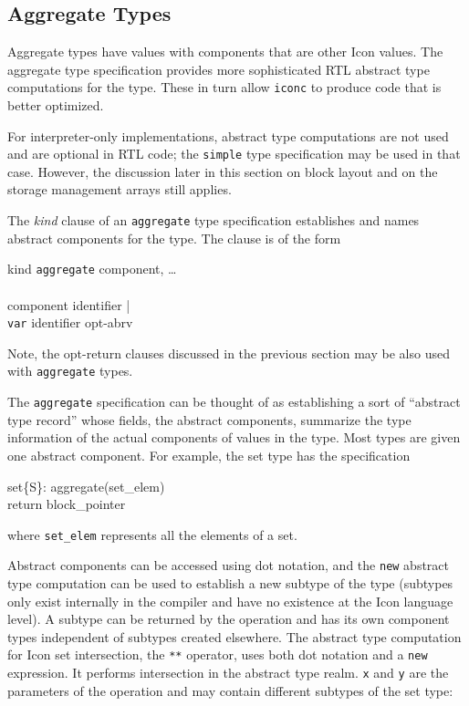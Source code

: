 \subsection{Aggregate Types}

Aggregate types have values with components that are other Icon values.
The aggregate type specification provides more sophisticated RTL abstract
type computations for the type. These in turn allow \texttt{iconc} to
produce code that is better optimized.

For interpreter-only implementations, abstract type computations are not
used and are optional in RTL code; the \texttt{simple} type specification
may be used in that case. However, the discussion later in this section on
block layout and on the storage management arrays still applies.


The \textit{kind} clause of an \texttt{aggregate} type specification
establishes and names abstract components for the type. The clause is of
the form

\begin{ebnf}
kind \cceq \texttt{aggregate} \toklbra component, \ldots \tokrbra\\
\\
component \cceq identifier |\\
\>\>\>\>\>       \texttt{var} identifier opt-abrv
\end{ebnf}

\noindent
Note, the opt-return clauses discussed in the previous section may be
also used with \texttt{aggregate} types.

The \texttt{aggregate} specification can be thought of as establishing a
sort of ``abstract type record'' whose fields, the abstract components,
summarize the type information of the actual components of values in the
type. Most types are given one abstract component. For example, the set
type has the specification
\begin{iconcode}
set\{S\}: \>\>\> aggregate(set\_elem)\\
\>\>\>           return block\_pointer
\end{iconcode}
\noindent
where \texttt{set\_elem} represents all the elements of a set.


Abstract components can be accessed using dot notation, and the
\texttt{new} abstract type computation can be used to establish a
new subtype of the type (subtypes only exist internally in the
compiler and have no existence at the Icon language level). A subtype
can be returned by the operation and has its own component types
independent of subtypes created elsewhere. The abstract type
computation for Icon set intersection, the \texttt{**} operator, uses
both dot notation and a \texttt{new} expression. It performs
intersection in the abstract type realm. \texttt{x} and \texttt{y} are
the parameters of the operation and may contain different subtypes of
the set type:

